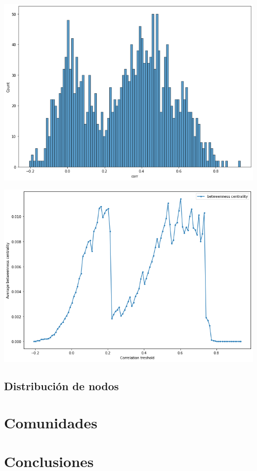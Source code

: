 \documentclass[runningheads,a4paper,10pt]{etc/llncs}
\let\stdsection\section
\renewcommand\section{\newpage\stdsection}
\begin{document}
\includegraphics[scale=.35]{images/correlation_hist.png}

\includegraphics[scale=.35]{images/betweeness_centrality.png}


\subsection{Distribución de nodos}


\section{Comunidades}

\section{Conclusiones}



\end{document}
